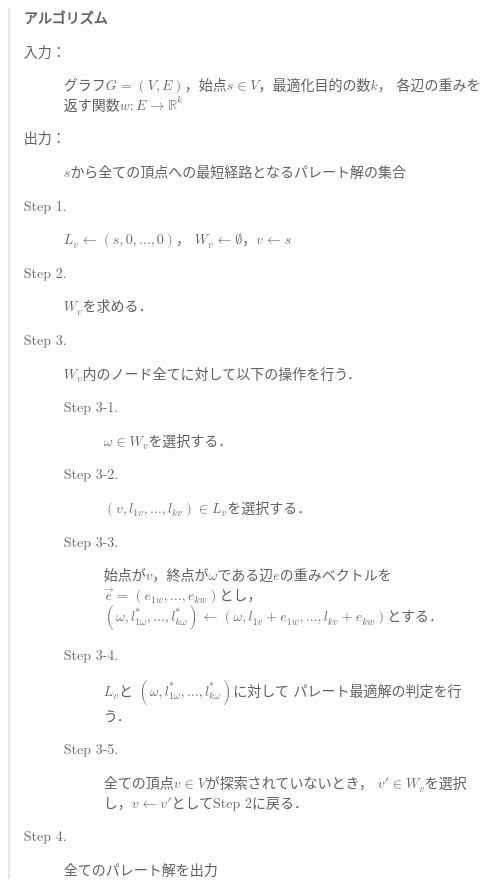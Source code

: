 \documentclass[12pt]{optlab-bachelor}
\begin{document}
\begin{quote}
  \textbf{アルゴリズム}
  \begin{description}
    \item[入力：] グラフ$G=(V,E)$，始点$s \in V$，最適化目的の数$k$，
    各辺の重みを返す関数$w : E \to \mathbb{R}^k$
    \item[出力：] $s$から全ての頂点への最短経路となるパレート解の集合
    \item[Step 1.] $L_v \leftarrow (s,0,\ldots,0)$，
    $W_v \leftarrow \emptyset$，$v \leftarrow s$
    \item[Step 2.] $W_v$を求める．
    \item[Step 3.] $W_v$内のノード全てに対して以下の操作を行う．
    \begin{description}
      \item[Step 3-1.] $\omega \in W_v$を選択する．
      \item[Step 3-2.] $(v,l_{1v},\ldots,l_{kv}) \in L_v$を選択する．
      \item[Step 3-3.] 始点が$v$，終点が$\omega$である辺$e$の重みベクトルを
      $\vec{e} = (e_{1w},\ldots,e_{kw})$とし，
      $(\omega,l^*_{1\omega},\ldots,l^*_{k\omega}) \leftarrow
      (\omega,l_{1v}+e_{1w},\ldots,l_{kv}+e_{kw})$とする．
      \item[Step 3-4.] $L_v$と
      $(\omega,l^*_{1\omega},\ldots,l^*_{k\omega})$に対して
      パレート最適解の判定を行う．
      \item[Step 3-5.] 全ての頂点$v \in V$が探索されていないとき，
      $v' \in W_v$を選択し，$v \leftarrow v'$としてStep 2に戻る．
    \end{description}
    \item[Step 4.] 全てのパレート解を出力
  \end{description}
\end{quote}
\end{document}
